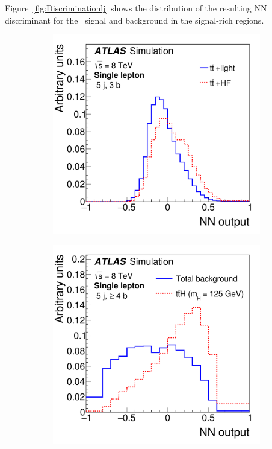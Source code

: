 

Figure~\ref{fig:Discriminationlj} shows the 
distribution of the resulting NN discriminant for the \tth\ signal and
background in the signal-rich regions. 

\begin{figure}[tb!]
\centering
\begin{subfigure}{0.49\textwidth}
\includegraphics[width=\textwidth]{Analysis/Figures_ttH/NN125_5j_3b_kin_5_flav.pdf}\label{fig:Discriminationlj_a}
\caption{}\end{subfigure}
\begin{subfigure}{0.49\textwidth}
\includegraphics[width=\textwidth]{Analysis/Figures_ttH/NN125_5j_ge4b_kin_5_sep.pdf}\label{fig:Discriminationlj_b}\\

\end{subfigure}
\end{figure}
